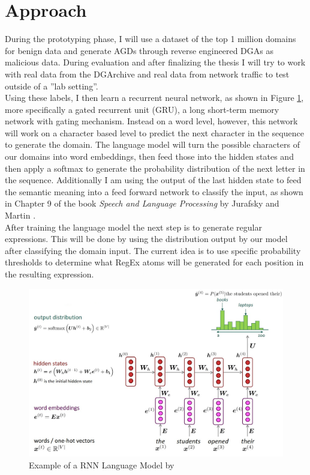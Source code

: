 \documentclass[a4paper, 12pt]{article}
\begin{document}
\section{Approach}
During the prototyping phase, I will use a dataset of the top 1 million domains
\cite{CiscoPopularityList} for benign data and
generate AGDs through reverse engineered DGAs \cite{baderDomainGenerationAlgorithms2024}
as malicious data. During evaluation and
after finalizing the thesis I will try to work with real data from the
DGArchive \cite{DGArchiveFraunhoferFKIE} and real data from
network traffic to test outside of a ''lab setting''.\\
Using these labels, I then learn a recurrent neural network, as shown in Figure \ref{fig:RNNLanguageModel},
more specifically a gated recurrent unit (GRU), a long short-term memory network with gating mechanism.
Instead on a word level, however, this network will work on a character based level to predict the next
character in the sequence to generate the domain.
The language model will turn the possible characters of our domains into word embeddings, then feed
those into the hidden states and then apply a softmax to generate the probability distribution of
the next letter in the sequence.
Additionally I am using the output of the last hidden state to feed the semantic meaning into a feed
forward network to classify the input, as shown in Chapter 9 of the book \textit{Speech and Language
Processing} by Jurafsky and Martin \cite{jurafskyRNNsSequenceClassification2024}.\\ 
After training the language model the next step is to generate regular expressions. This will be
done by using the distribution output by our model after classifying the domain input. The current
idea is to use specific probability thresholds to determine what RegEx atoms will be generated for
each position in the resulting expression.
\begin{figure}[h]
    \includegraphics[width=\textwidth]{cs224n-spr2024-lecture05-language-model.png}
    \caption{Example of a RNN Language Model by \cite{manningNaturalLanguageProcessing2024}}
    \label{fig:RNNLanguageModel}
\end{figure}
\end{document}
